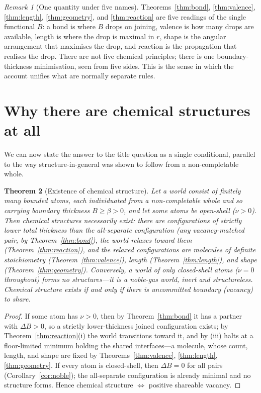 \documentclass[11pt,a4paper]{article}
\theoremstyle{thmstyle}
\newtheorem{theorem}{Theorem}[section]
\theoremstyle{definition}
\theoremstyle{remark}
\newtheorem{remark}[theorem]{Remark}
\newcommand{\floorc}{\beta}
\newcommand{\thick}{B}                 %
\newcommand{\vac}{\nu}                 %
\begin{document}
\begin{remark}[One quantity under five names]
\label{rem:one-quantity}
Theorems~\ref{thm:bond}, \ref{thm:valence}, \ref{thm:length},
\ref{thm:geometry}, and \ref{thm:reaction} are five readings of the
single functional $\thick$: a bond is where $\thick$ drops on joining,
valence is how many drops are available, length is where the drop is
maximal in $r$, shape is the angular arrangement that maximises the drop,
and reaction is the propagation that realises the drop. There are not five
chemical principles; there is one boundary-thickness minimisation, seen
from five sides. This is the sense in which the account unifies what are
normally separate rules.
\end{remark}

\section{Why there are chemical structures at all}
\label{sec:why}

We can now state the answer to the title question as a single
conditional, parallel to the way structure-in-general was shown to follow
from a non-completable whole.

\begin{theorem}[Existence of chemical structure]
\label{thm:why}
Let a world consist of finitely many bounded atoms, each individuated from
a non-completable whole and so carrying boundary thickness
$\thick\ge\floorc>0$, and let some atoms be open-shell ($\vac>0$). Then
chemical structures necessarily exist: there are configurations of strictly
lower total thickness than the all-separate configuration (any
vacancy-matched pair, by Theorem~\ref{thm:bond}), the world relaxes toward
them (Theorem~\ref{thm:reaction}), and the relaxed configurations are
molecules of definite stoichiometry (Theorem~\ref{thm:valence}), length
(Theorem~\ref{thm:length}), and shape (Theorem~\ref{thm:geometry}).
Conversely, a world of only closed-shell atoms ($\vac=0$ throughout) forms
no structures---it is a noble-gas world, inert and structureless. Chemical
structure exists if and only if there is uncommitted boundary (vacancy) to
share.
\end{theorem}

\begin{proof}
If some atom has $\vac>0$, then by Theorem~\ref{thm:bond} it has a
partner with $\Delta\thick>0$, so a strictly lower-thickness joined
configuration exists; by Theorem~\ref{thm:reaction}(i) the world
transitions toward it, and by (iii) halts at a floor-limited minimum
holding the shared interfaces---a molecule, whose count, length, and shape
are fixed by Theorems~\ref{thm:valence}, \ref{thm:length},
\ref{thm:geometry}. If every atom is closed-shell, then $\Delta\thick=0$
for all pairs (Corollary~\ref{cor:noble}); the all-separate configuration
is already minimal and no structure forms. Hence chemical structure
$\iff$ positive shareable vacancy.
\end{proof}
\end{document}
